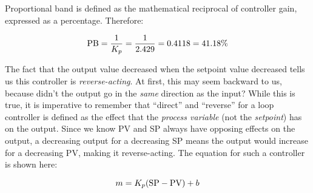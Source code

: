 Proportional band is defined as the mathematical reciprocal of controller gain, expressed as a percentage.  Therefore:

$$\hbox{PB} = {1 \over K_p} = {1 \over 2.429} = 0.4118 = 41.18\%$$

\vskip 10pt

The fact that the output value decreased when the setpoint value decreased tells us this controller is {\it reverse-acting}.  At first, this may seem backward to us, because didn't the output go in the {\it same} direction as the input?  While this is true, it is imperative to remember that ``direct'' and ``reverse'' for a loop controller is defined as the effect that the {\it process variable} (not the {\it setpoint}) has on the output.  Since we know PV and SP always have opposing effects on the output, a decreasing output for a decreasing SP means the output would increase for a decreasing PV, making it reverse-acting.  The equation for such a controller is shown here:

$$m = K_p (\hbox{SP} - \hbox{PV}) + b$$




